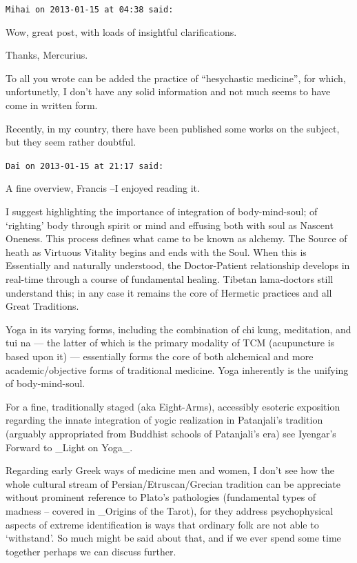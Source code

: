 \begin{footnotesize}
\begin{sffamily}
\texttt{Mihai on 2013-01-15 at 04:38 said:}

Wow, great post, with loads of insightful clarifications.

Thanks, Mercurius.

To all you wrote can be added the practice of ``hesychastic medicine'', for which, unfortunetly, I don't have any solid information and not much seems to have come in written form.

Recently, in my country, there have been published some works on the subject, but they seem rather doubtful.

\hfill

\texttt{Dai on 2013-01-15 at 21:17 said:}

A fine overview, Francis --I enjoyed reading it.

I suggest highlighting the importance of integration of body-mind-soul; of `righting' body through spirit or mind and effusing both with soul as Nascent Oneness. This process defines what came to be known as alchemy. The Source of heath as Virtuous Vitality begins and ends with the Soul. When this is Essentially and naturally understood, the Doctor-Patient relationship develops in real-time through a course of fundamental healing. Tibetan lama-doctors still understand this; in any case it remains the core of Hermetic practices and all Great Traditions.

Yoga in its varying forms, including the combination of chi kung, meditation, and tui na --- the latter of which is the primary modality of TCM (acupuncture is based upon it) --- essentially forms the core of both alchemical and more academic/objective forms of traditional medicine. Yoga inherently is the unifying of body-mind-soul.

For a fine, traditionally staged (aka Eight-Arms), accessibly esoteric exposition regarding the innate integration of yogic realization in Patanjali's tradition (arguably appropriated from Buddhist schools of Patanjali's era) see Iyengar's Forward to \_Light on Yoga\_.

Regarding early Greek ways of medicine men and women, I don't see how the whole cultural stream of Persian/Etruscan/Grecian tradition can be appreciate without prominent reference to Plato's pathologies (fundamental types of madness -- covered in \_Origins of the Tarot), for they address psychophysical aspects of extreme identification is ways that ordinary folk are not able to `withstand'. So much might be said about that, and if we ever spend some time together perhaps we can discuss further.


\end{sffamily}
\end{footnotesize}
